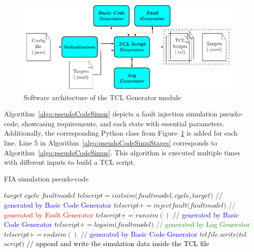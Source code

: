 
\begin{figure}[ht]
    \centering
    \includegraphics[width=\textwidth]{c4_fissa/img/fissa/detail_tcl_gen.pdf}
    \caption{Software architecture of the TCL Generator module}
    \label{fig:archi_tcl_gen}
\end{figure}

Algorithm~\ref{algo:pseudoCodeSimus} depicts a fault injection simulation pseudo-code, showcasing requirements, and each state with essential parameters. Additionally, the corresponding Python class from Figure~\ref{fig:archi_tcl_gen} is added for each line.
Line 5 in Algorithm~\ref{algo:pseudoCodeSimuStages} corresponds to Algorithm~\ref{algo:pseudoCodeSimus}. This algorithm is executed multiple times with different inputs to build a TCL script.


\begin{algorithm}
    \caption{FIA simulation pseudo-code}
    \label{algo:pseudoCodeSimus}
    \normalsize
    \begin{algorithmic}[1]
        \Require $target$
        \Require $cycle$
        \Require $fault$\textunderscore$model$
        \State $tcl$\textunderscore$script = init$\textunderscore$sim(fault$\textunderscore$model, cycle, target)$ \textcolor{blue}{\scriptsize // generated by Basic Code Generator}
        \State $tcl$\textunderscore$script += inject$\textunderscore$fault(fault$\textunderscore$model)$  \textcolor{red}{\scriptsize // generated by Fault Generator}
        \State $tcl$\textunderscore$script += run$\textunderscore$sim()$ \textcolor{blue}{\scriptsize // generated by Basic Code Generator}
        \State $tcl$\textunderscore$script += log$\textunderscore$sim(fault$\textunderscore$model)$ \textcolor{ForestGreen}{\scriptsize // generated by Log Generator}
        \State $tcl$\textunderscore$script += end$\textunderscore$sim()$ \textcolor{blue}{\scriptsize // generated by Basic Code Generator}
        \State $tcl$\textunderscore$file.write(tcl$\textunderscore$script)$ \textcolor{black}{\scriptsize // append and write the simulation data inside the TCL file}
    \end{algorithmic}
\end{algorithm}

